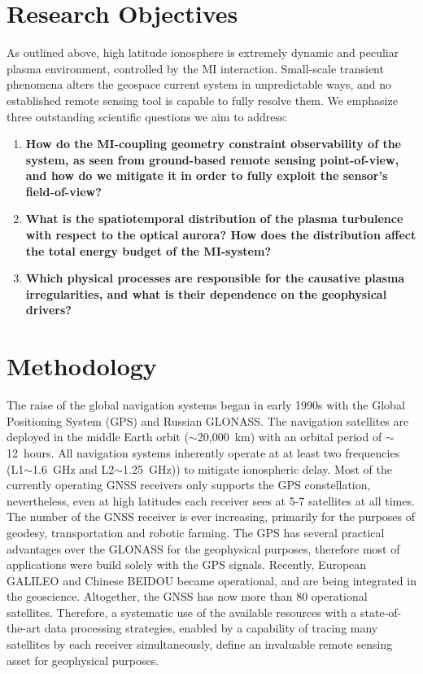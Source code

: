 \documentclass[letterpaper,12pt]{article}
\begin{document}
\section{Research Objectives}

As outlined above, high latitude ionosphere is extremely dynamic and peculiar plasma environment, controlled by the MI interaction. Small-scale transient phenomena alters the geospace current system in unpredictable ways, and no established remote sensing tool is capable to fully resolve them. We emphasize three outstanding scientific questions we aim to address:
\vspace{-0.5em}
\begin{enumerate}
\item \textbf{How do the MI-coupling geometry constraint observability of the system, as seen from ground-based remote sensing point-of-view, and how do we mitigate it in order to fully exploit the sensor's field-of-view?}
\vspace{-0.5em}
\item \textbf{What is the spatiotemporal distribution of the plasma turbulence with respect to the optical aurora? How does the distribution affect the total energy budget of the MI-system?}
\vspace{-0.5em}
\item \textbf{Which physical processes are responsible for the causative plasma irregularities, and what is their dependence on the geophysical drivers?}
\end{enumerate}
\vspace{-1.5em}\section{Methodology}

The raise of the global navigation systems began in early 1990s with the Global Positioning System (GPS) and Russian GLONASS. The navigation satellites are deployed in the middle Earth orbit ($\sim$20,000~km) with an orbital period of $\sim$12~hours. All navigation systems inherently operate at at least two frequencies (L1$\sim$1.6~GHz and L2$\sim$1.25~GHz)) to mitigate ionospheric delay. Most of the currently operating GNSS receivers only supports the GPS constellation, nevertheless, even at high latitudes  each receiver sees at 5-7 satellites at all times. The number of the GNSS receiver is ever increasing, primarily for the purposes of geodesy, transportation and robotic farming. The GPS has several practical advantages over the GLONASS for the geophysical purposes, therefore most of applications were build solely with the GPS signals. Recently, European GALILEO and Chinese BEIDOU became operational, and are being integrated in the geoscience. Altogether, the GNSS has now more than 80 operational satellites. Therefore, a systematic use of the available resources with a state-of-the-art data processing strategies, enabled by a capability of tracing many satellites by each receiver simultaneously, define an invaluable remote sensing asset for geophysical purposes. 
\end{document}
